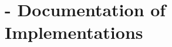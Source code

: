 % 
%               
%          
% 
\chapter{\texorpdfstring{\protect\marktool{\toolnameshort}}{\toolnameshort} - Documentation of Implementations}
\setcounter{currentlevel}{6}




\newpage

